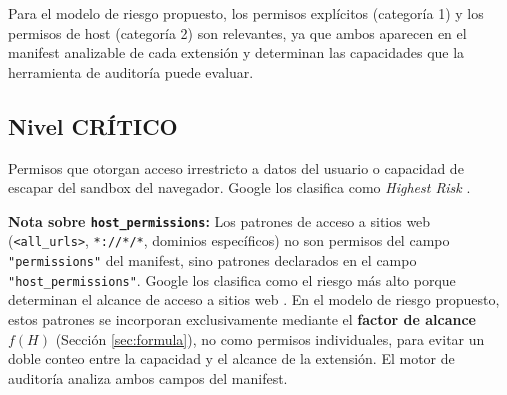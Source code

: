 \documentclass[12pt,oneside]{report}
\begin{document}
Para el modelo de riesgo propuesto, los permisos explícitos (categoría 1) y los permisos de host (categoría 2) son relevantes, ya que ambos aparecen en el manifest analizable de cada extensión y determinan las capacidades que la herramienta de auditoría puede evaluar.

\subsection{Nivel CRÍTICO}

Permisos que otorgan acceso irrestricto a datos del usuario o capacidad de escapar del sandbox del navegador. Google los clasifica como \textit{Highest Risk} \cite{google_permission_risk}.

\textbf{Nota sobre \texttt{host\_permissions}:} Los patrones de acceso a sitios web (\texttt{<all\_urls>}, \texttt{*://*/*}, dominios específicos) no son permisos del campo \texttt{"permissions"} del manifest, sino patrones declarados en el campo \texttt{"host\_permissions"}. Google los clasifica como el riesgo más alto porque determinan el alcance de acceso a sitios web \cite{google_permission_risk}. En el modelo de riesgo propuesto, estos patrones se incorporan exclusivamente mediante el \textbf{factor de alcance $f(H)$} (Sección \ref{sec:formula}), no como permisos individuales, para evitar un doble conteo entre la capacidad y el alcance de la extensión. El motor de auditoría analiza ambos campos del manifest.
\end{document}
